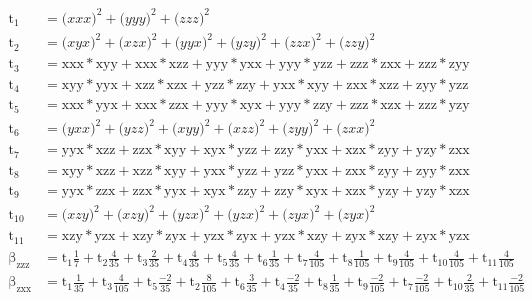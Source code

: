 \documentclass{article}
\begin{document}
	\begin{align}\label{eq:beta_hrs_T}
	\mathrm{t_1} &= \mathrm({xxx})^{2} + \mathrm({yyy})^{2} + \mathrm({zzz})^{2}\\
	\mathrm{t_2} &= \mathrm({xyx})^{2} + \mathrm({xzx})^{2} + \mathrm({yyx})^{2} + \mathrm({yzy})^{2} + \mathrm({zzx})^{2} + \mathrm({zzy})^{2}\\
	\mathrm{t_3}&= \mathrm{xxx} * \mathrm{xyy} + \mathrm{xxx} * \mathrm{xzz} + \mathrm{yyy} * \mathrm{yxx} + \mathrm{yyy} * \mathrm{yzz} + \mathrm{zzz} * \mathrm{zxx} + \mathrm{zzz} * \mathrm{zyy} \\
	\mathrm{t_4} &= \mathrm{xyy} * \mathrm{yyx} + \mathrm{xzz} * \mathrm{xzx} + \mathrm{yzz} * \mathrm{zzy} + \mathrm{yxx} * \mathrm{xyy} + \mathrm{zxx} * \mathrm{xzz} + \mathrm{zyy} * \mathrm{yzz} \\
	\mathrm{t_5} &= \mathrm{xxx} * \mathrm{yyx} + \mathrm{xxx} * \mathrm{zzx} + \mathrm{yyy} * \mathrm{xyx} + \mathrm{yyy} * \mathrm{zzy} + \mathrm{zzz} * \mathrm{xzx} + \mathrm{zzz} * \mathrm{yzy}\\
	\mathrm{t_6} &= \mathrm({yxx})^{2} + \mathrm({yzz})^{2} + \mathrm({xyy})^{2} + \mathrm({xzz})^{2} + \mathrm({zyy})^{2} + \mathrm({zxx})^{2} \\
	\mathrm{t_7} &= \mathrm{yyx} * \mathrm{xzz} + \mathrm{zzx} * \mathrm{xyy} + \mathrm{xyx} * \mathrm{yzz} + \mathrm{zzy} * \mathrm{yxx} + \mathrm{xzx} * \mathrm{zyy} + \mathrm{yzy} * \mathrm{zxx}\\
	\mathrm{t_8} &= \mathrm{xyy} * \mathrm{xzz} + \mathrm{xzz} * \mathrm{xyy} + \mathrm{yxx} * \mathrm{yzz} + \mathrm{yzz} * \mathrm{yxx} + \mathrm{zxx} * \mathrm{zyy} + \mathrm{zyy} * \mathrm{zxx}\\
	\mathrm{t_9} &= \mathrm{yyx} * \mathrm{zzx} + \mathrm{zzx} * \mathrm{yyx} + \mathrm{xyx} * \mathrm{zzy} + \mathrm{zzy} * \mathrm{xyx} + \mathrm{xzx} * \mathrm{yzy} + \mathrm{yzy} * \mathrm{xzx} \\
	\mathrm{t_{10}} &= \mathrm({xzy})^{2} + \mathrm({xzy})^{2} + \mathrm({yzx})^{2} + \mathrm({yzx})^{2} + \mathrm({zyx})^{2} + \mathrm({zyx})^{2} \\
	\mathrm{t_{11}} &= \mathrm{xzy} * \mathrm{yzx} + \mathrm{xzy} * \mathrm{zyx} + \mathrm{yzx} * \mathrm{zyx} + \mathrm{yzx} * \mathrm{xzy} + \mathrm{zyx} * \mathrm{xzy} + \mathrm{zyx} * \mathrm{yzx} \\
	\mathrm{\beta_{zzz}} &= \mathrm{t_1} \frac{1}{7} + \mathrm{t_2}  \frac{4}{35} + \mathrm{t_3}  \frac{2}{35} + \mathrm{t_4}  \frac{4}{35} + \mathrm{t_5}  \frac{4}{35} + \mathrm{t_6}  \frac{1}{35} + \mathrm{t_7}  \frac{4}{105} + \mathrm{t_8}  \frac{1}{105} + \mathrm{t_9}  \frac{4}{105} + \mathrm{t_{10}}  \frac{4}{105} + \mathrm{t_{11}}  \frac{4}{105}\\
	\mathrm{\beta_{zxx}} &= \mathrm{t_1}  \frac{1}{35} + \mathrm{t_3}  \frac{4}{105} + \mathrm{t_5}  \frac{-2}{35} + \mathrm{t_2}  \frac{8}{105} + \mathrm{t_6}  \frac{3}{35} + \mathrm{t_4}  \frac{-2}{35} + \mathrm{t_8}  \frac{1}{35} + \mathrm{t_9}  \frac{-2}{105} + \mathrm{t_7}  \frac{-2}{105} + \mathrm{t_{10}}  \frac{2}{35} + \mathrm{t_{11}}  \frac{-2}{105}\\
	\end{align}
\end{document}
